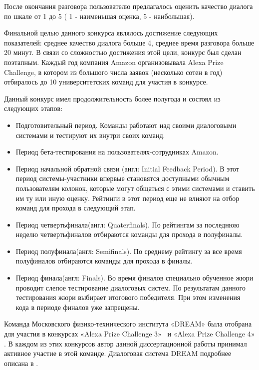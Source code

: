 После окончания разговора пользователю предлагалось оценить качество диалога по шкале от 1 до 5 ( 1 - наименьшая оценка, 5 - наибольшая). 

Финальной целью данного конкурса являлось достижение следующих показателей: среднее качество диалога больше 4, среднее время разговора больше 20 минут. В связи со сложностью достижения этой цели, конкурс был сделан поэтапным. Каждый год компания Amazon организовывала Alexa Prize Challenge, в котором из большого числа заявок (несколько сотен в год) отбиралось до 10 университетских команд для участия в конкурсе. 

Данный конкурс имел продолжительность более полугода и состоял из следующих этапов:
\begin{itemize}
\item Подготовительный период. Команды работают над своими диалоговыми системами и тестируют их внутри своих команд.
\item Период бета-тестирования на пользователях-сотрудниках Amazon.
\item Период начальной обратной связи (англ: Initial Feedback Period). В этот период системы-участники впервые становятся доступными обычным пользователям колонок, которые могут общаться с этими системами и ставить им ту или иную оценку. Рейтинги в этот период еще не влияют на отбор команд для прохода в следующий этап.
\item Период четвертьфинала(англ: Quaterfinals). По рейтингам за последнюю неделю четвертьфиналов отбираются команды для прохода в полуфиналы.
\item Период полуфинала(англ: Semifinals). По среднему рейтингу за все время полуфиналов отбираются команды для прохода в финалы.
\item Период финала(англ: Finals). Во время финалов специально обученное жюри проводит слепое тестирование диалоговых систем. По результатам данного тестирования жюри выбирает итогового победителя. При этом изменения кода в периоде финалов уже запрещены.
\end{itemize}

Команда Московского физико-технического института «DREAM» была отобрана для участия в конкурсах «Alexa Prize Challenge 3»~\cite{na_website_ndh} и «Alexa Prize Challenge 4» \cite{na_website_ndi}. В каждом из этих конкурсов автор данной диссертационной работы принимал активное участие в этой команде. Диалоговая система {DREAM} подробнее описана в \cite{dream1, dream1_trudy, dream2}.

